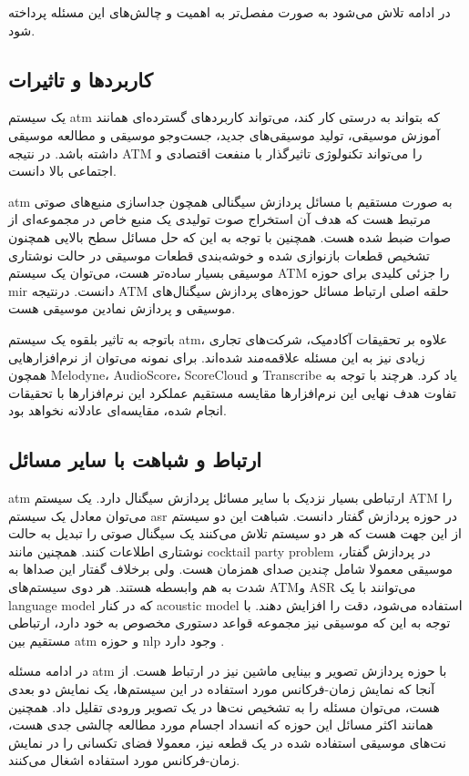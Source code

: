 در ادامه تلاش می‌شود به صورت مفصل‌تر به اهمیت و چالش‌های این مسئله پرداخته شود.

\subsection{کاربردها و تاثیرات}
یک سیستم \gls{atm} که بتواند به درستی کار کند، می‌تواند کاربردهای گسترده‌ای
همانند آموزش موسیقی، تولید موسیقی‌های جدید، جست‌وجو موسیقی و مطالعه موسیقی داشته
باشد. در نتیجه \gls{ATM} را می‌تواند تکنولوژی تاثیرگذار با منفعت اقتصادی و
اجتماعی بالا دانست.

\gls{atm} به صورت مستقیم با مسائل پردازش سیگنالی همچون جداسازی منبع‌های صوتی
مرتبط هست که هدف آن استخراج صوت تولیدی یک منبع خاص در مجموعه‌ای از صوات ضبط شده
هست. همچنین با توجه به این که حل مسائل سطح بالایی همچنون تشخیص قطعات بازنوازی
شده و خوشه‌بندی قطعات موسیقی در حالت نوشتاری موسیقی بسیار ساده‌تر هست، می‌توان
یک سیستم \gls{ATM} را جزئی کلیدی برای حوزه \gls{mir} دانست. درنتیجه \gls{ATM}
حلقه اصلی ارتباط مسائل حوزه‌های پردازش سیگنال‌های موسیقی و پردازش نمادین موسیقی
هست.

باتوجه به تاثیر بلقوه یک سیستم \gls{atm}، علاوه بر تحقیقات آکادمیک، شرکت‌های
تجاری زیادی نیز به این مسئله علاقمه‌مند شده‌اند. برای نمونه می‌توان از
نرم‌افزارهایی همچون Melodyne، AudioScore، ScoreCloud و Transcribe یاد کرد. هرچند
با توجه به تفاوت هدف نهایی این نرم‌افزارها مقایسه مستقیم عملکرد این نرم‌افزارها
با تحقیقات انجام شده، مقایسه‌ای عادلانه نخواهد بود.

\subsection{ارتباط و شباهت با سایر مسائل}
\gls{atm} ارتباطی بسیار نزدیک با سایر مسائل پردازش سیگنال دارد. یک سیستم
\gls{ATM} را می‌توان معادل یک سیستم \gls{asr} در حوزه پردازش گفتار دانست. شباهت
این دو سیستم از این جهت هست که هر دو سیستم تلاش می‌کنند یک سیگنال صوتی را تبدیل
به حالت نوشتاری اطلاعات کنند. همچنین مانند \gls{cocktail party problem} در
پردازش گفتار، موسیقی معمولا شامل چندین صدای همزمان هست. ولی برخلاف گفتار این
صداها به شدت به هم وابسطه هستند. هر دوی سیستم‌های \gls{ATM}و \gls{ASR} می‌توانند
با یک \gls{language model} که در کنار \gls{acoustic model} استفاده می‌شود، دقت
را افزایش دهند. با توجه به این که موسیقی نیز مجموعه قواعد دستوری مخصوص به خود
دارد، ارتباطی مستقیم بین \gls{atm} و حوزه \gls{nlp} وجود دارد
\cite{boulanger2012modeling}.

در ادامه مسئله \gls{atm} با حوزه پردازش تصویر و بینایی ماشین نیز در ارتباط هست.
از آنجا که نمایش زمان-فرکانس مورد استفاده در این سیستم‌ها، یک نمایش دو بعدی هست،
می‌توان مسئله را به تشخیص نت‌ها در یک تصویر ورودی تقلیل داد. همچنین همانند اکثر
مسائل این حوزه که انسداد اجسام مورد مطالعه چالشی جدی هست، نت‌های موسیقی استفاده
شده در یک قطعه نیز، معمولا فضای تکسانی را در نمایش زمان-فرکانس مورد استفاده
اشغال می‌کنند.

